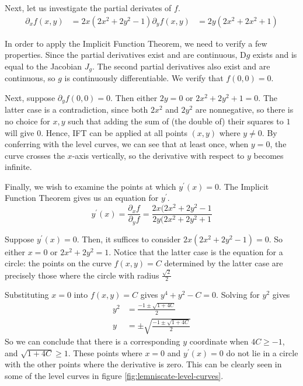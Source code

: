 \documentclass[letterpaper,11pt]{article}
\newcommand{\D}{\mathrm{D}}
\begin{document}
Next, let us investigate the partial derivates of $f$.
\begin{align*}
    \partial_x f(x, y) &= 2x(2x^2 + 2y^2 - 1)
    \partial_y f(x, y) &= 2y(2x^2 + 2x^2 + 1)
\end{align*}

In order to apply the Implicit Function Theorem, we need to verify a few
properties. Since the partial derivatives exist and are continuous,
$\D g$ exists and is equal to the Jacobian $J_g$. The second partial
derivatives also exist and are continuous, so $g$ is continuously
differentiable. We verify that $f(0, 0) = 0$.

Next, suppose $\partial_y f(0, 0) = 0$. Then either $2y = 0$ or
$2x^2 + 2y^2 + 1 = 0$. The latter case is a contradiction, since both $2x^2$
and $2y^2$ are nonnegative, so there is no choice for $x, y$ such that adding
the sum of (the double of) their squares to $1$ will give $0$. Hence, IFT can
be applied at all points $(x, y)$ where $y \neq 0$. By conferring with the
level curves, we can see that at least once, when $y = 0$, the curve crosses
the $x$-axis vertically, so the derivative with respect to $y$ becomes
infinite.

Finally, we wish to examine the points at which $y^\prime(x) = 0$.
The Implicit Function Theorem gives us an equation for $y^\prime$.
\begin{equation*}
    y^\prime(x) = \frac{\partial_x f}{\partial_y f}
    = \frac{2x(2x^2 + 2y^2 - 1}{2y(2x^2 + 2y^2 + 1}
\end{equation*}

Suppose $y^\prime(x) = 0$. Then, it suffices to consider
$2x(2x^2 + 2y^2 - 1) = 0$. So either $x = 0$ or $2x^2 + 2y^2 = 1$. Notice that
the latter case is the equation for a circle: the points on the curve
$f(x, y) = C$ determined by the latter case are precisely those where the
circle with radius $\frac{\sqrt{2}}{2}$

Substituting $x = 0$ into $f(x, y) = C$ gives $y^4 + y^2 - C = 0$. Solving for
$y^2$ gives
\begin{align*}
    y^2 &= \frac{-1 \pm \sqrt{1 + 4C}}{2} \\
    y &= \pm \sqrt{ \frac{-1 \pm \sqrt{1 + 4C}}{2} }
\end{align*}
So we can conclude that there is a corresponding $y$ coordinate when
$4C \geq -1$, and $\sqrt{1 + 4C} \geq 1$. These points where $x = 0$ and
$y^\prime(x) = 0$ do not lie in a circle with the other points where the
derivative is zero. This can be clearly seen in some of the level curves in
figure \ref{fig:lemniscate-level-curves}.
\end{document}
